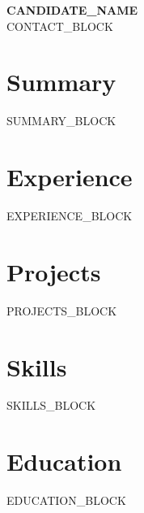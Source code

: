 \documentclass[11pt,letterpaper]{article}
\begin{document}
\begin{center}
  {\LARGE \textbf{{{CANDIDATE_NAME}}}} \\[4pt]
  {{CONTACT_BLOCK}}
\end{center}

\section*{Summary}
{{SUMMARY_BLOCK}}

\section*{Experience}
{{EXPERIENCE_BLOCK}}

\section*{Projects}
{{PROJECTS_BLOCK}}

\section*{Skills}
{{SKILLS_BLOCK}}

\section*{Education}
{{EDUCATION_BLOCK}}
\end{document}
